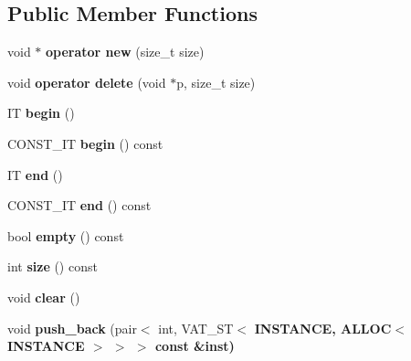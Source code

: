 \subsection*{Public Member Functions}
\begin{CompactItemize}
\item 
void $\ast$ \textbf{operator new} (size\_\-t size)\label{classvat_3_01SEQ__PROP_00_01V__Fkk__IND__MINE__PROP_00_01ALLOC_00_01VAT__ST_01_4_b75547c61e9d21128d476bf8d060133e}

\item 
void \textbf{operator delete} (void $\ast$p, size\_\-t size)\label{classvat_3_01SEQ__PROP_00_01V__Fkk__IND__MINE__PROP_00_01ALLOC_00_01VAT__ST_01_4_68386adb00617f3f8fdec75ad25d0068}

\item 
IT \textbf{begin} ()\label{classvat_3_01SEQ__PROP_00_01V__Fkk__IND__MINE__PROP_00_01ALLOC_00_01VAT__ST_01_4_5913bebc7436d782090c72b5c38e6155}

\item 
CONST\_\-IT \textbf{begin} () const \label{classvat_3_01SEQ__PROP_00_01V__Fkk__IND__MINE__PROP_00_01ALLOC_00_01VAT__ST_01_4_27f25c7b61d58a435e738e8cf4063fd5}

\item 
IT \textbf{end} ()\label{classvat_3_01SEQ__PROP_00_01V__Fkk__IND__MINE__PROP_00_01ALLOC_00_01VAT__ST_01_4_5bb60b848033734ffc1c6f16c98729dd}

\item 
CONST\_\-IT \textbf{end} () const \label{classvat_3_01SEQ__PROP_00_01V__Fkk__IND__MINE__PROP_00_01ALLOC_00_01VAT__ST_01_4_e25bee89765a536853a92b601149ae48}

\item 
bool \textbf{empty} () const \label{classvat_3_01SEQ__PROP_00_01V__Fkk__IND__MINE__PROP_00_01ALLOC_00_01VAT__ST_01_4_63bf7a5f4492c550dca91fb4f20553fe}

\item 
int \textbf{size} () const \label{classvat_3_01SEQ__PROP_00_01V__Fkk__IND__MINE__PROP_00_01ALLOC_00_01VAT__ST_01_4_49ea0834a95a9d67910c08a69152e421}

\item 
void \textbf{clear} ()\label{classvat_3_01SEQ__PROP_00_01V__Fkk__IND__MINE__PROP_00_01ALLOC_00_01VAT__ST_01_4_caad027a4970092b17e9c6479591070f}

\item 
void \textbf{push\_\-back} (pair$<$ int, VAT\_\-ST$<$ \bf{INSTANCE}, ALLOC$<$ \bf{INSTANCE} $>$ $>$ $>$ const \&inst)\label{classvat_3_01SEQ__PROP_00_01V__Fkk__IND__MINE__PROP_00_01ALLOC_00_01VAT__ST_01_4_561267fb8aa89ad799a7d080d2aa0445}


\end{CompactItemize}
